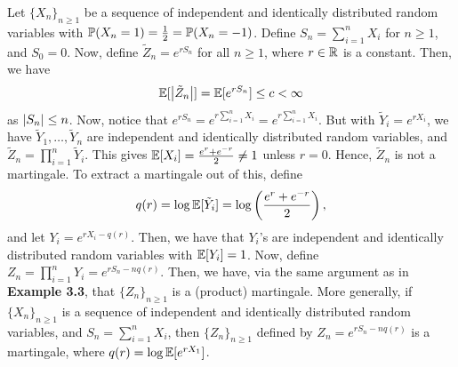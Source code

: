 \begin{example}
    Let $\{X_{n}\}_{n \geq 1}$ be a sequence of independent and identically distributed random variables with $\mathbb{P}(X_{n}=1) = \frac{1}{2} = \mathbb{P}(X_{n}=-1)$. Define $S_{n} = \sum_{i=1}^{n} X_{i}$ for $n \geq 1$, and $S_{0} = 0$. Now, define $\tilde{Z}_{n} = e^{rS_{n}}$ for all $n \geq 1$, where $r \in \mathbb{R}$ is a constant. Then, we have
    \begin{align}
        \mathbb{E}[\left| \tilde{Z}_{n} \right|] = \mathbb{E}[e^{rS_{n}}] \leq c < \infty
    \end{align}
    as $\left| S_{n} \right| \leq n$. Now, notice that $e^{rS_{n}} = e^{r\sum_{i=1}^{n} X_{i}} = e^{r\sum_{i=1}^{n} X_{i}}$. But with $\tilde{Y}_{i} = e^{rX_{i}}$, we have $\tilde{Y}_{1},\ldots,\tilde{Y}_{n}$ are independent and identically distributed random variables, and $\tilde{Z}_{n} = \prod_{i=1}^{n} \tilde{Y}_{i}$. This gives $\mathbb{E}[X_{i}] = \frac{e^{r}+e^{-r}}{2} \neq 1$ unless $r = 0$. Hence, $\tilde{Z}_{n}$ is not a martingale. To extract a martingale out of this, define
    \begin{align}
        q(r) = \log \mathbb{E}[\tilde{Y}_{i}] = \log \left( \frac{e^{r}+e^{-r}}{2} \right),
    \end{align}
    and let $Y_{i} = e^{rX_{i}-q(r)}$. Then, we have that $Y_{i}$'s are independent and identically distributed random variables with $\mathbb{E}[Y_{i}] = 1$. Now, define $Z_{n} = \prod_{i=1}^{n} Y_{i} = e^{rS_{n}-nq(r)}$. Then, we have, via the same argument as in \textbf{Example 3.3}, that $\{Z_{n}\}_{n \geq 1}$ is a (product) martingale. More generally, if $\{X_{n}\}_{n \geq 1}$ is a sequence of independent and identically distributed random variables, and $S_{n} = \sum_{i=1}^{n} X_{i}$, then $\{Z_{n}\}_{n \geq 1}$ defined by $Z_{n} = e^{rS_{n}-nq(r)}$ is a martingale, where $q(r) = \log \mathbb{E}[e^{rX_{1}}]$.
\end{example}

